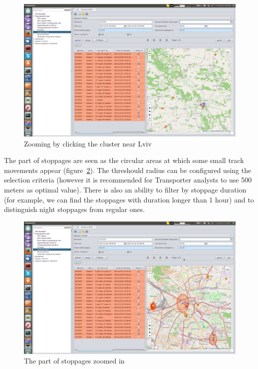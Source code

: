 \begin{figure}[H]
\centering
\includegraphics[width=\linewidth]{chapters/03-stoppages/images/22-part-of-stoppages-zooming-by-clicking-cluster-near-lviv.png}
\caption{Zooming by clicking the cluster near Lviv}\label{fig:22}
\end{figure}

\newpage
The part of stoppages are seen as the circular areas at which some small track movements appear (figure~\ref{fig:23}). The threshould radius can be configured using the selection criteria (however it is recommended for Transporter analysts to use 500 meters as optimal value). There is also an ability to filter by stoppage duration (for example, we can find the stoppages with duration longer than 1 hour) and to distinguish night stoppages from regular ones.

\begin{figure}[H]
\centering
\includegraphics[width=\linewidth]{chapters/03-stoppages/images/23-part-of-stoppages-zoomed-in.png}
\caption{The part of stoppages zoomed in}\label{fig:23}
\end{figure}

